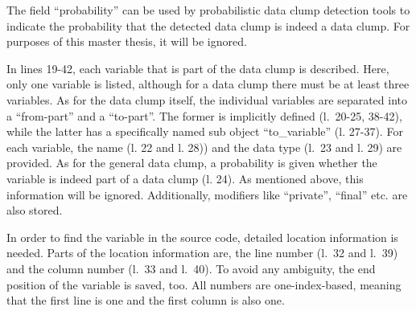 The field \enquote{probability} can be used by probabilistic data clump detection tools to indicate the probability that the detected data clump is indeed a data clump. For purposes of this master thesis, it will be ignored. 

In lines 19-42, each variable that is part of the data clump is described. Here, only one variable is listed, although for a data clump there must be at least three variables. As for the data clump itself, the individual variables are separated into a \enquote{from-part} and a \enquote{to-part}. The former is implicitly defined (l.~20-25, 38-42), while the latter has a specifically named sub object \enquote{to\_variable} (l. 27-37). For each variable, the name (l. 22 and l. 28)) and the data type (l.~23 and l. 29) are provided. As for the general data clump, a probability is given whether the variable is indeed part of a data clump (l. 24). As mentioned above, this information will be ignored.  Additionally, modifiers like \enquote{private}, \enquote{final} etc. are also stored. 

In order to find the variable in the source code, detailed location information is needed. Parts of the location information are, the line number (l.~32 and l.~39) and the column number (l.~33 and l.~40). To avoid any ambiguity, the end position of the variable is saved, too. All numbers are one-index-based, meaning that the first line is one and the first column is also one. 